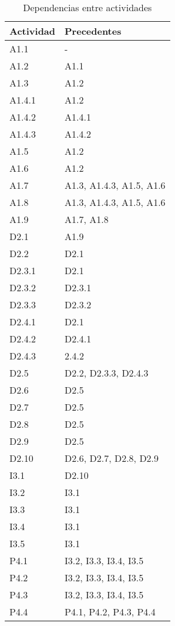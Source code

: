 \documentclass[11pt,a4paper,spanish,twoside]{report}
\begin{document}
\begin{table}[!h]
  \centering
  \begin{tabular}{|l||l|}
    \hline
    \textbf{Actividad} & \textbf{Precedentes}\\
    \hline \hline
    A1.1   & -                        \\
    A1.2   & A1.1                     \\
    A1.3   & A1.2                     \\
    A1.4.1 & A1.2                     \\
    A1.4.2 & A1.4.1                   \\
    A1.4.3 & A1.4.2                   \\
    A1.5   & A1.2                     \\
    A1.6   & A1.2                     \\
    A1.7   & A1.3, A1.4.3, A1.5, A1.6 \\
    A1.8   & A1.3, A1.4.3, A1.5, A1.6 \\
    A1.9   & A1.7, A1.8               \\
    \hline
    D2.1   & A1.9                     \\
    D2.2   & D2.1                     \\
    D2.3.1 & D2.1                     \\
    D2.3.2 & D2.3.1                   \\
    D2.3.3 & D2.3.2                   \\
    D2.4.1 & D2.1                     \\
    D2.4.2 & D2.4.1                   \\
    D2.4.3 & 2.4.2                    \\
    D2.5   & D2.2, D2.3.3, D2.4.3     \\
    D2.6   & D2.5                     \\
    D2.7   & D2.5                     \\
    D2.8   & D2.5                     \\
    D2.9   & D2.5                     \\
    D2.10  & D2.6, D2.7, D2.8, D2.9   \\
    \hline
    I3.1   & D2.10                    \\
    I3.2   & I3.1                     \\
    I3.3   & I3.1                     \\
    I3.4   & I3.1                     \\
    I3.5   & I3.1                     \\
    \hline
    P4.1   & I3.2, I3.3, I3.4, I3.5   \\
    P4.2   & I3.2, I3.3, I3.4, I3.5   \\
    P4.3   & I3.2, I3.3, I3.4, I3.5   \\
    P4.4   & P4.1, P4.2, P4.3, P4.4   \\
    \hline
    
  \end{tabular}
  \caption{Dependencias entre actividades} \label{Tab:tabdep}
\end{table}
\end{document}
